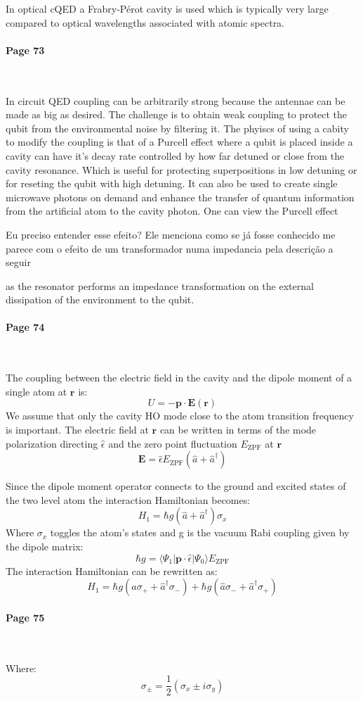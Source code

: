 \documentclass[12pt]{article}
\numberwithin{equation}{subsection}
\newcommand\ask[1]{
{\color{red}
#1
}
}
\newcommand\page[1]{
{
\color{blue}\paragraph{
Page #1
}\mbox{}\\
}
}
\begin{document}
In optical cQED a Frabry-Pérot cavity is used which is typically very large compared to optical wavelengths associated with atomic spectra. 

\page{73}
In circuit QED coupling can be arbitrarily strong because the antennae can be made as big as desired. The challenge is to obtain weak coupling to protect the qubit from the environmental noise by filtering it. The phyiscs of using a cabity to modify the coupling is that of a Purcell effect where a qubit is placed inside a cavity can have it's decay rate controlled by how far detuned or close from the cavity resonance. Which is useful for protecting superpositions in low detuning or for reseting the qubit with high detuning.
It can also be used to create single microwave photons on demand and enhance the transfer of quantum information from the artificial atom to the cavity photon.
One can view the Purcell effect
\ask{Eu preciso entender esse efeito? Ele menciona como se já fosse conhecido me parece com o efeito de um transformador numa impedancia pela descrição a seguir}
as the resonator performs an impedance transformation on the external dissipation of the environment to the qubit.

\page{74}
The coupling between the electric field in the cavity and the dipole moment of a single atom at $\mathbf r$ is:
\begin{equation}
    U=-\mathbf p \cdot \mathbf E(\mathbf r)
\end{equation}
We assume that only the cavity HO mode close to the atom transition frequency  is important.
The electric field at $\mathbf r$ can be written in terms of the mode polarization directing $\hat \epsilon$ and the zero point fluctuation $ E_{\textrm{ZPF}}$ at $\mathbf r$
\begin{equation}
\mathbf E = \hat \epsilon E_{\textrm{ZPF}}(\hat a+ \hat a^\dagger)
\end{equation}

Since the dipole moment operator connects to the ground and excited states of the two level atom the interaction Hamiltonian becomes:
\begin{equation}
    H_1 = \hbar g (\hat a+ \hat a^\dagger) \sigma_x
\end{equation}
Where $\sigma_x$ toggles the atom's states and g is the vacuum Rabi coupling given by the dipole matrix:
\begin{equation}
   \hbar g = \langle \Psi_1| \mathbf p \cdot \hat \epsilon |\Psi_0\rangle E_{\textrm{ZPF}} 
\end{equation}
The interaction Hamiltonian can be rewritten as:
\begin{equation}
    H_1 = \hbar g (\hat a\sigma_++ \hat a^\dagger\sigma_-)  +\hbar g (\hat a\sigma_-+ \hat a^\dagger\sigma_+)
    \label{eq:int-hamil}
\end{equation}
\page{75}
Where:
\begin{equation}
    \sigma_\pm = \frac{1}{2}(\sigma_x \pm i\sigma_y)
\end{equation}
\end{document}
